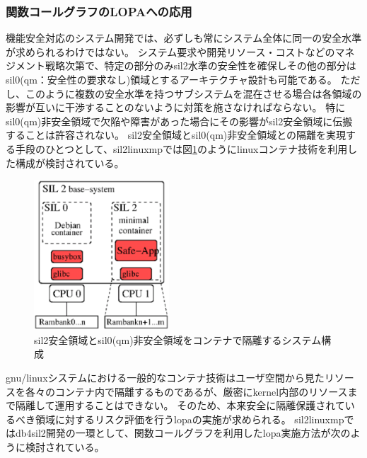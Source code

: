\subsubsection{関数コールグラフのLOPAへの応用}
\label{sil0}
機能安全対応のシステム開発では、必ずしも常にシステム全体に同一の安全水準が求められるわけではない。
システム要求や開発リソース・コストなどのマネジメント戦略次第で、特定の部分のみ\acrshort{sil2}水準の安全性を確保しその他の部分は\acrshort{sil0}(\gls{qm}：安全性の要求なし)領域とするアーキテクチャ設計も可能である。
ただし、このように複数の安全水準を持つサブシステムを混在させる場合は各領域の影響が互いに干渉することのないように対策を施さなければならない。
特に\acrshort{sil0}(\acrshort{qm})非安全領域で欠陥や障害があった場合にその影響が\acrshort{sil2}安全領域に伝搬することは許容されない。
\acrshort{sil2}安全領域と\acrshort{sil0}(\acrshort{qm})非安全領域との隔離を実現する手段のひとつとして、\acrshort{sil2linuxmp}では図\ref{isol}のように\acrshort{linux}コンテナ技術を利用した構成が検討されている。
\begin{figure}[ht]
  \centering
  \includegraphics[width=0.45\textwidth]{pic/isol.eps}
  \caption{\acrshort{sil2}安全領域と\acrshort{sil0}(\acrshort{qm})非安全領域をコンテナで隔離するシステム構成}
  \label{isol}
\end{figure}
\par
\acrshort{gnu}/\acrshort{linux}システムにおける一般的なコンテナ技術はユーザ空間から見たリソースを各々のコンテナ内で隔離するものであるが、厳密にkernel内部のリソースまで隔離して運用することはできない。
そのため、本来安全に隔離保護されているべき領域に対するリスク評価を行う\gls{lopa}の実施が求められる。
\acrshort{sil2linuxmp}では\acrshort{db4sil2}開発の一環として、関数コールグラフを利用した\acrshort{lopa}実施方法が次のように検討されている。
